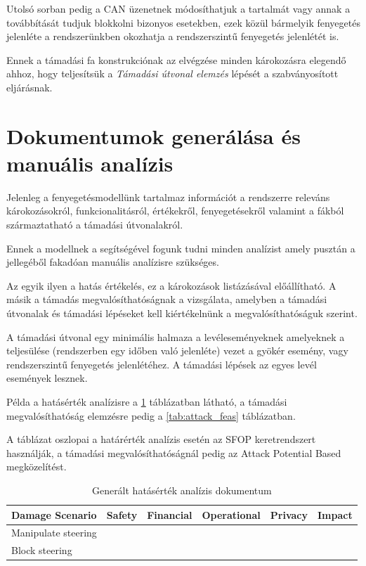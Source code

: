 Utolsó sorban pedig a CAN üzenetnek módosíthatjuk a tartalmát vagy annak a továbbítását tudjuk blokkolni bizonyos esetekben, ezek közül bármelyik fenyegetés jelenléte a rendszerünkben okozhatja a rendszerszintű fenyegetés jelenlétét is.

Ennek a támadási fa konstrukciónak az elvégzése minden károkozásra elegendő ahhoz, hogy teljesítsük a \textit{Támadási útvonal elemzés} lépését a szabványosított eljárásnak. 

\section{Dokumentumok generálása és manuális analízis}

Jelenleg a fenyegetésmodellünk tartalmaz információt a rendszerre releváns károkozásokról, funkcionalitásról, értékekről, fenyegetésekről valamint a fákból származtatható a támadási útvonalakról.

Ennek a modellnek a segítségével fogunk tudni minden analízist amely pusztán a jellegéből fakadóan manuális analízisre szükséges.

Az egyik ilyen a hatás értékelés, ez a károkozások listázásával előállítható. A másik a támadás megvalósíthatóságnak a vizsgálata, amelyben a támadási útvonalak és támadási lépéseket kell kiértékelnünk a megvalósíthatóságuk szerint.

A támadási útvonal egy minimális halmaza a levéleseményeknek amelyeknek a teljesülése (rendszerben egy időben való jelenléte) vezet a gyökér esemény, vagy rendszerszintű fenyegetés jelenlétéhez. A támadási lépések az egyes levél események lesznek.

Példa a hatásérték analízisre a \ref{tab:impact_rating} táblázatban látható, a támadási megvalósíthatóság elemzésre pedig a \ref{tab:attack_feas} táblázatban.

A táblázat oszlopai a határérték analízis esetén az SFOP keretrendszert használják, a támadási megvalósíthatóságnál pedig az Attack Potential Based megközelítést.

\begin{table}[h]
	\centering
	\begin{tabular}{|l|l|l|l|l|l|}
		\hline
		Damage Scenario & Safety & Financial & Operational & Privacy & Impact \\ \hline
		Manipulate steering & ~ & ~ & ~ & ~ & ~ \\ \hline
		Block steering & ~ & ~ & ~ & ~ & ~ \\ \hline
	\end{tabular}
	\caption{Generált hatásérték analízis dokumentum}
	\label{tab:impact_rating}
\end{table}

